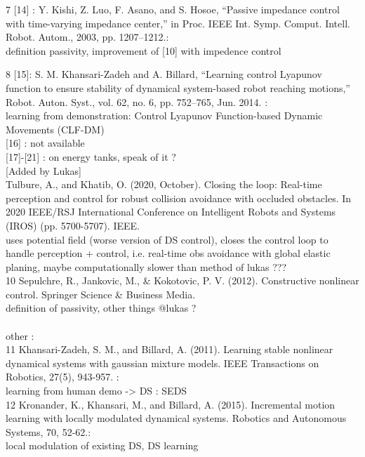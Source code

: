 7 [14] : Y. Kishi, Z. Luo, F. Asano, and S. Hosoe, “Passive impedance control
with time-varying impedance center,” in Proc. IEEE Int. Symp. Comput.
Intell. Robot. Autom., 2003, pp. 1207–1212.:\\
definition passivity, improvement of [10] with impedence control

8 [15]:  S. M. Khansari-Zadeh and A. Billard, “Learning control Lyapunov
function to ensure stability of dynamical system-based robot reaching
motions,” Robot. Auton. Syst., vol. 62, no. 6, pp. 752–765, Jun. 2014. :\\
learning from demonstration:  Control Lyapunov Function-based Dynamic Movements (CLF-DM)\\

[16] : not available\\

[17]-[21] : on energy tanks, speak of it ?\\

[Added by Lukas] \\
Tulbure, A., and Khatib, O. (2020, October). Closing the loop: Real-time perception and control for robust collision avoidance with occluded obstacles. In 2020 IEEE/RSJ International Conference on Intelligent Robots and Systems (IROS) (pp. 5700-5707). IEEE.\\
uses potential field (worse version of DS control), closes the control loop to handle perception + control, i.e. real-time obs avoidance with global elastic planing, maybe computationally slower than method of lukas ???\\

10 Sepulchre, R., Jankovic, M., \& Kokotovic, P. V. (2012). Constructive nonlinear control. Springer Science & Business Media.\\
definition of passivity, other things @lukas ?\\
[End Lukas] \\


other : \\

11 Khansari-Zadeh, S. M., and Billard, A. (2011). Learning stable nonlinear dynamical systems with gaussian mixture models. IEEE Transactions on Robotics, 27(5), 943-957. :\\
learning from human demo -> DS : SEDS\\

12 Kronander, K., Khansari, M., and Billard, A. (2015). Incremental motion learning with locally modulated dynamical systems. Robotics and Autonomous Systems, 70, 52-62.:\\
local modulation of existing DS, DS learning\\

